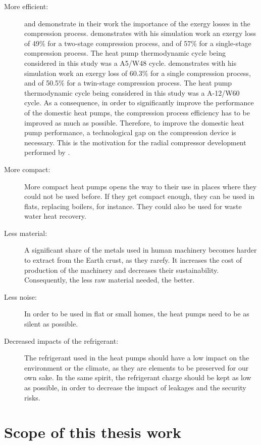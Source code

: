 \begin{description}
\item[More efficient:] \citet{Zehnder-2004a} and
  \citet{barbouchi-2007a} demonstrate in their work the importance of
  the exergy losses in the compression process.  \citet[Fig.\,I.2
  p.\,206]{barbouchi-2007a} demonstrates with his simulation work an
  exergy loss of 49\% for a two-stage compression process, and of 57\%
  for a single-stage compression process. The heat pump thermodynamic
  cycle being considered in this study was a A5/W48
  cycle. \citet[p.\,227]{Zehnder-2004a} demonstrates with his
  simulation work an exergy loss of 60.3\% for a single compression
  process, and of 50.5\% for a twin-stage compression process. The heat
  pump thermodynamic cycle being considered in this study was a
  A-12/W60 cycle. As a consequence, in order to significantly improve
  the performance of the domestic heat pumps, the compression process
  efficiency has to be improved as much as possible. Therefore, to
  improve the domestic heat pump performance, a technological gap on
  the compression device is necessary. This is the motivation for the
  radial compressor development performed by \citet{schiffmann-2008a}.
\item[More compact:] More compact heat pumps opens the way to their use
  in places where they could not be used before. If they get compact
  enough, they can be used in flats, replacing boilers, for
  instance. They could also be used for waste water heat recovery.
\item[Less material:] A significant share of the metals used in human
  machinery becomes harder to extract from the Earth crust, as they
  rarefy. It increases the cost of production of the machinery and
  decreases their sustainability. Consequently, the less raw material
  needed, the better.
\item[Less noise:] In order to be used in flat or small homes, the heat
  pumps need to be as silent as possible.
\item[Decreased impacts of the refrigerant:] The refrigerant used in
  the heat pumps should have a low impact on the environment or the
  climate, as they are elements to be preserved for our own sake. In
  the same spirit, the refrigerant charge should be kept as low as
  possible, in order to decrease the impact of leakages and the
  security risks.
\end{description}

\section{Scope of this thesis work}
\label{sec:intro-thesis-scope}

